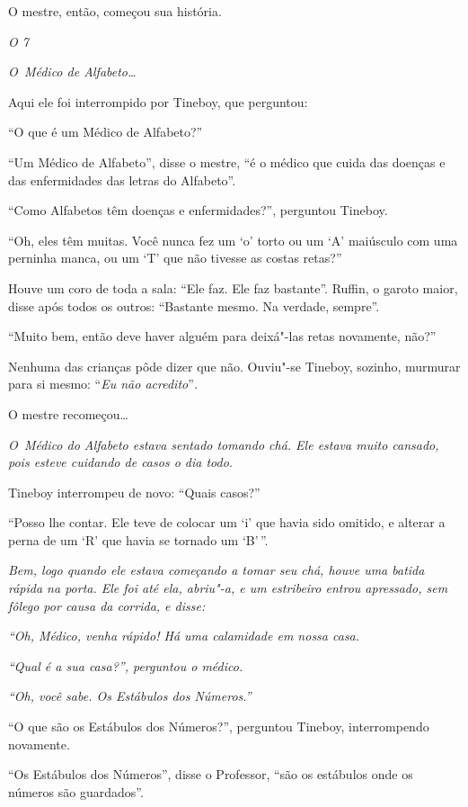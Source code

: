 O mestre, então, começou sua história.

\emph{ O  7  }


\emph{O~Médico de Alfabeto…}

Aqui ele foi interrompido por Tineboy, que perguntou:

``O que é um Médico de Alfabeto?''

``Um Médico de Alfabeto'', disse o mestre, ``é o médico que cuida das
doenças e das enfermidades das letras do Alfabeto''.

``Como Alfabetos têm doenças e enfermidades?'', perguntou Tineboy.

``Oh, eles têm muitas. Você nunca fez um `o' torto ou um `A' maiúsculo
com uma perninha manca, ou um `T' que não tivesse as costas retas?''

Houve um coro de toda a sala: ``Ele faz. Ele faz bastante''. Ruffin, o
garoto maior, disse após todos os outros: ``Bastante mesmo. Na verdade,
sempre''.

``Muito bem, então deve haver alguém para deixá"-las retas novamente,
não?''

Nenhuma das crianças pôde dizer que não. Ouviu"-se Tineboy, sozinho,
murmurar para si mesmo: ``\emph{Eu não acredito}''\emph{.}

O mestre recomeçou…

\emph{O~Médico do Alfabeto estava sentado tomando chá. Ele estava muito
cansado, pois esteve cuidando de casos o dia todo.}

Tineboy interrompeu de novo: ``Quais casos?''

``Posso lhe contar. Ele teve de colocar um `i' que havia sido omitido, e
alterar a perna de um `R' que havia se tornado um `B'\,''.

\emph{Bem, logo quando ele estava começando a tomar seu chá, houve uma
batida rápida na porta. Ele foi até ela, abriu"-a, e um estribeiro entrou
apressado, sem fôlego por causa da corrida, e disse:}

\emph{``Oh, Médico, venha rápido! Há uma calamidade em nossa casa.}

\emph{``Qual é a sua casa?'', perguntou o médico.}

\emph{``Oh, você sabe. Os Estábulos dos Números.''}

``O que são os Estábulos dos Números?'', perguntou Tineboy,
interrompendo novamente.

``Os Estábulos dos Números'', disse o Professor, ``são os estábulos onde
os números são guardados''.

